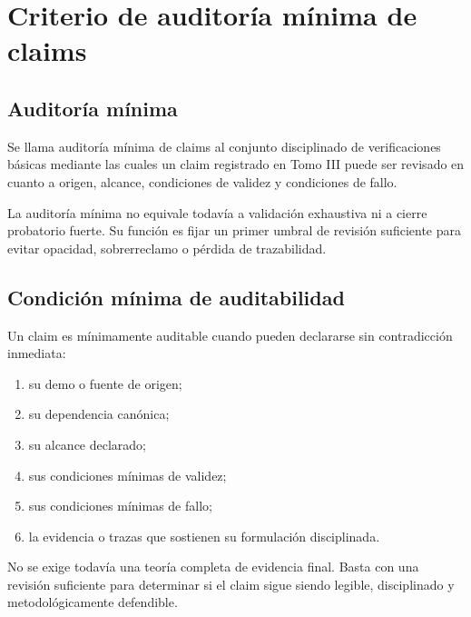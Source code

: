 \chapter{Criterio de auditoría mínima de claims}

\section{Auditoría mínima}
\begin{definition}
Se llama auditoría mínima de claims al conjunto disciplinado de verificaciones básicas mediante las cuales un claim registrado en Tomo III puede ser revisado en cuanto a origen, alcance, condiciones de validez y condiciones de fallo.
\end{definition}

\begin{observation}
La auditoría mínima no equivale todavía a validación exhaustiva ni a cierre probatorio fuerte. Su función es fijar un primer umbral de revisión suficiente para evitar opacidad, sobrerreclamo o pérdida de trazabilidad.
\end{observation}

\section{Condición mínima de auditabilidad}
\begin{definition}
Un claim es mínimamente auditable cuando pueden declararse sin contradicción inmediata:
\begin{enumerate}
  \item su demo o fuente de origen;
  \item su dependencia canónica;
  \item su alcance declarado;
  \item sus condiciones mínimas de validez;
  \item sus condiciones mínimas de fallo;
  \item la evidencia o trazas que sostienen su formulación disciplinada.
\end{enumerate}
\end{definition}

\begin{observation}
No se exige todavía una teoría completa de evidencia final. Basta con una revisión suficiente para determinar si el claim sigue siendo legible, disciplinado y metodológicamente defendible.
\end{observation}

